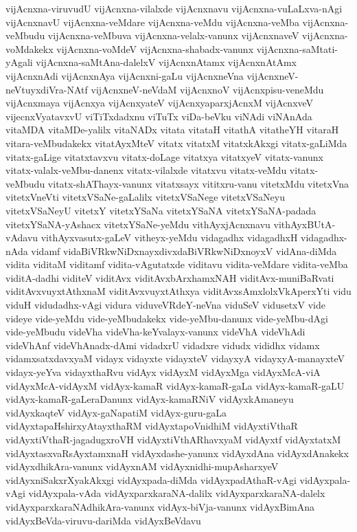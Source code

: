 {vijAcnxna-viruvudU
vijAcnxna-vilalxde
vijAcnxnavu
vijAcnxna-vuLaLxva-nAgi
vijAcnxnavU
vijAcnxna-veMdare
vijAcnxna-veMdu
vijAcnxna-veMba
vijAcnxna-veMbudu
vijAcnxna-veMbuva
vijAcnxna-velalx-vanunx
vijAcnxnaveV
vijAcnxna-voMdakekx
vijAcnxna-voMdeV
vijAcnxna-shabadx-vanunx
vijAcnxna-saMtati-yAgali
vijAcnxna-saMtAna-dalelxV
vijAcnxnAtamx
vijAcnxnAtAmx
vijAcnxnAdi
vijAcnxnAya
vijAcnxni-gaLu
vijAcnxneVna
vijAcnxneV-neVtuyxdiVra-NAtf
vijAcnxneV-neVdaM
vijAcnxnoV
vijAcnxpisu-veneMdu
vijAcnxmaya
vijAcnxya
vijAcnxyateV
vijAcnxyaparxjAcnxM
vijAcnxveV
vijecnxVyatavxvU
viTiTxdadxnu
viTuTx
viDa-beVku
viNAdi
viNAnAda
vitaMDA
vitaMDe-yalilx
vitaNADx
vitata
vitataH
vitathA
vitatheYH
vitaraH
vitara-veMbudakekx
vitatAyxMteV
vitatx
vitatxM
vitatxkAkxgi
vitatx-gaLiMda
vitatx-gaLige
vitatxtavxvu
vitatx-doLage
vitatxya
vitatxyeV
vitatx-vanunx
vitatx-valalx-veMbu-danenx
vitatx-vilalxde
vitatxvu
vitatx-veMdu
vitatx-veMbudu
vitatx-shAThayx-vanunx
vitatxsayx
vititxru-vanu
vitetxMdu
vitetxVna
vitetxVneVti
vitetxVSaNe-gaLalilx
vitetxVSaNege
vitetxVSaNeyu
vitetxVSaNeyU
vitetxY
vitetxYSaNa
vitetxYSaNA
vitetxYSaNA-padada
vitetxYSaNA-yAshacx
vitetxYSaNe-yeMdu
vithAyxjAcnxnavu
vithAyxBUtA-vAdavu
vithAyxvasutx-gaLeV
vitheyx-yeMdu
vidagadhx
vidagadhxH
vidagadhx-nAda
vidamf
vidaBiVRkwNiDxnayxdivxdaBiVRkwNiDxnoyxV
vidAna-diMda
vidita
viditaM
viditamf
vidita-vAgutatxde
viditavu
vidita-veMdare
vidita-veMba
viditA-dadhi
viditeV
viditAvx
viditAvxbArxhamxNAH
viditAvx-muniBaRvati
viditAvxvuyxtAthxnaM
viditAvxvuyxtAthxya
viditAvxsAmxlolxVkAperxYti
vidu
viduH
vidudadhx-vAgi
vidura
viduveVRdeY-neVna
viduSeV
vidusetxV
vide
videye
vide-yeMdu
vide-yeMbudakekx
vide-yeMbu-danunx
vide-yeMbu-dAgi
vide-yeMbudu
videVha
videVha-keYvalayx-vanunx
videVhA
videVhAdi
videVhAnf
videVhAnadx-dAmi
vidadxrU
vidadxre
vidudx
vididhx
vidamx
vidamxsatxdavxyaM
vidayx
vidayxte
vidayxteV
vidayxyA
vidayxyA-manayxteV
vidayx-yeYva
vidayxthaRvu
vidAyx
vidAyxM
vidAyxMga
vidAyxMcA-viA
vidAyxMcA-vidAyxM
vidAyx-kamaR
vidAyx-kamaR-gaLa
vidAyx-kamaR-gaLU
vidAyx-kamaR-gaLeraDanunx
vidAyx-kamaRNiV
vidAyxkAmaneyu
vidAyxkaqteV
vidAyx-gaNapatiM
vidAyx-guru-gaLa
vidAyxtapaHshirxyAtayxthaRM
vidAyxtapoVnidhiM
vidAyxtiVthaR
vidAyxtiVthaR-jagadugxroVH
vidAyxtiVthARhavxyaM
vidAyxtf
vidAyxtatxM
vidAyxtasxvaRsAyxtamxnaH
vidAyxdashe-yanunx
vidAyxdAna
vidAyxdAnakekx
vidAyxdhikAra-vanunx
vidAyxnAM
vidAyxnidhi-mupAsharxyeV
vidAyxniSakxrXyakAkxgi
vidAyxpada-diMda
vidAyxpadAthaR-vAgi
vidAyxpala-vAgi
vidAyxpala-vAda
vidAyxparxkaraNA-dalilx
vidAyxparxkaraNA-dalelx
vidAyxparxkaraNAdhikAra-vanunx
vidAyx-biVja-vanunx
vidAyxBimAna
vidAyxBeVda-viruvu-dariMda
vidAyxBeVdavu
}
